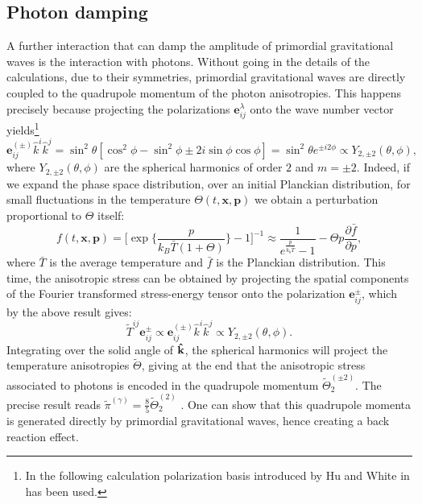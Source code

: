 \subsection{Photon damping}
\label{sec:photon_damping}
A further interaction that can damp the amplitude of primordial gravitational waves is the interaction with photons. Without going in the details of the calculations, due to their symmetries, primordial gravitational waves are directly coupled to the quadrupole momentum of the photon anisotropies. This happens precisely because projecting the polarizations $\mathbf{e}_{ij}^\lambda$ onto the wave number vector yields\footnote{In the following calculation polarization basis introduced by Hu and White in \cite{HuWhite} has been used.}
$$\mathbf{e}_{ij}^{(\pm)}\hat k^i\hat k^j=\sin^2\theta[\cos^2\phi-\sin^2\phi\pm2i\sin\phi\cos\phi]=\sin^2\theta e^{\pm i2\phi}\propto Y_{2,\pm2}(\theta,\phi),$$
where $Y_{2,\pm2}(\theta,\phi)$ are the spherical harmonics of order $2$ and $m=\pm2$. Indeed, if we expand the phase space distribution, over an initial Planckian distribution, for small fluctuations in the temperature $\Theta(t,\mathbf x,\mathbf p)$ we obtain a perturbation proportional to $\Theta$ itself:
$$
f(t,\mathbf x,\mathbf p)=\bigg[\exp\bigg\{\frac{p}{k_B\bar T(1+\Theta)}\bigg\}-1\bigg]^{-1}\approx \frac{1}{e^{\frac{p}{k_b\bar T}}-1}-\Theta p\frac{\partial \bar f}{\partial p},
$$ 
where $\bar T$ is the average temperature and $\bar f$ is the Planckian distribution. This time, the anisotropic stress can be obtained by projecting the spatial components of the Fourier transformed stress-energy tensor onto the polarization $\mathbf{e}_{ij}^{\pm}$, which by the above result gives:
$$\tilde T^{ij}\mathbf{e}_{ij}^{\pm}\propto\mathbf{e}_{ij}^{(\pm)}\hat k^i\hat k^j\propto Y_{2,\pm2}(\theta,\phi).$$
Integrating over the solid angle of $\mathbf{\hat{k}}$, the spherical harmonics will project the temperature anisotropies $\tilde\Theta$, giving at the end that the anisotropic stress associated to photons is encoded in the quadrupole momentum $\tilde \Theta_{2}^{(\pm2)}$. The precise result reads $\tilde\pi^{(\gamma)}=\tfrac85\tilde\Theta^{(2)}_2$ \cite{HuWhite}.
One can show that this quadrupole momenta is generated directly by primordial gravitational waves, hence creating a back reaction effect.

